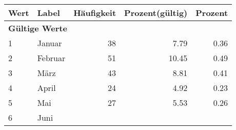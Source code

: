      \begin{longtable}{lXrrr}
     \toprule
     \textbf{Wert} & \textbf{Label} & \textbf{Häufigkeit} & \textbf{Prozent(gültig)} & \textbf{Prozent} \\
     \endhead
     \midrule
     \multicolumn{5}{l}{\textbf{Gültige Werte}}\\

     1 &
     \multicolumn{1}{X}{ Januar   } &


       \num{38} &
       \num[round-mode=places,round-precision=2]{7.79} &
         \num[round-mode=places,round-precision=2]{0.36} \\

     2 &
     \multicolumn{1}{X}{ Februar   } &


       \num{51} &
       \num[round-mode=places,round-precision=2]{10.45} &
         \num[round-mode=places,round-precision=2]{0.49} \\

     3 &
     \multicolumn{1}{X}{ März   } &


       \num{43} &
       \num[round-mode=places,round-precision=2]{8.81} &
         \num[round-mode=places,round-precision=2]{0.41} \\

     4 &
     \multicolumn{1}{X}{ April   } &


       \num{24} &
       \num[round-mode=places,round-precision=2]{4.92} &
         \num[round-mode=places,round-precision=2]{0.23} \\

     5 &
     \multicolumn{1}{X}{ Mai   } &


       \num{27} &
       \num[round-mode=places,round-precision=2]{5.53} &
         \num[round-mode=places,round-precision=2]{0.26} \\

     6 &
     \multicolumn{1}{X}{ Juni   } &



\end{longtable}
